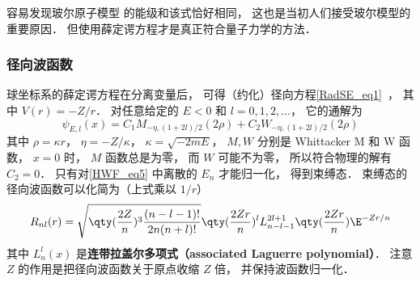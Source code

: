 容易发现玻尔原子模型 的能级和该式恰好相同， 这也是当初人们接受玻尔模型的重要原因． 但使用薛定谔方程才是真正符合量子力学的方法．

\subsubsection{径向波函数}
球坐标系的薛定谔方程在分离变量后， 可得（约化）径向方程\autoref{RadSE_eq1}~， 其中 $V(r) = -Z/r$． 对任意给定的 $E < 0$ 和 $l = 0,1,2,\dots$， 它的通解为
\begin{equation}
\psi_{E,l}(x) = C_1 M_{-\eta, (1+2l)/2}(2 \rho) + C_2 W_{-\eta, (1+2l)/2}(2 \rho)
\end{equation}
其中 $\rho = \kappa r$， $\eta = -Z/\kappa$， $\kappa = \sqrt{-2mE}$， $M, W$ 分别是 Whittacker M 和 W 函数， $x = 0$ 时， $M$ 函数总是为零， 而 $W$ 可能不为零， 所以符合物理的解有 $C_2 = 0$． 只有对\autoref{HWF_eq5} 中离散的 $E_n$ 才能归一化， 得到束缚态． 束缚态的径向波函数可以化简为（上式乘以 $1/r$）
\begin{equation}\label{HWF_eq2}
R_{nl}(r) = \sqrt{\qty(\frac{2 Z}{n})^3 \frac{(n - l - 1)!}{2n (n + l)!}} \qty(\frac{2Zr}{n})^l  L_{n-l-1}^{2l+1}\qty(\frac{2Zr}{n}) \E^{-Zr/n}
\end{equation}
其中 $L_n^l(x)$ 是\textbf{连带拉盖尔多项式（associated Laguerre polynomial）}． 注意 $Z$ 的作用是把径向波函数关于原点收缩 $Z$ 倍， 并保持波函数归一化．

